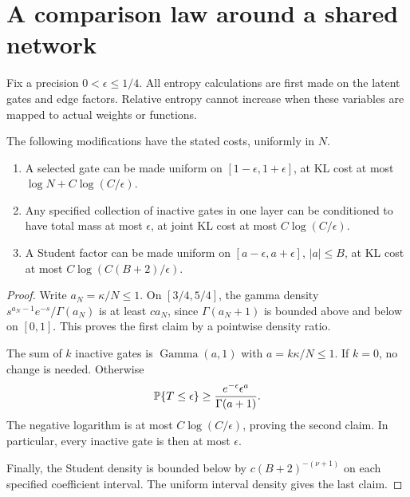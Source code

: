\section{A comparison law around a shared network}
Fix a precision $0<\epsilon\le1/4$. All entropy calculations are first made on the latent gates and edge factors. Relative entropy cannot increase when these variables are mapped to actual weights or functions.

\begin{lemma}\label{lem:scalar-gates}
The following modifications have the stated costs, uniformly in $N$.
\begin{enumerate}
\item A selected gate can be made uniform on $[1-\epsilon,1+\epsilon]$, at KL cost at most $\log N+C\log(C/\epsilon)$.
\item Any specified collection of inactive gates in one layer can be conditioned to have total mass at most $\epsilon$, at joint KL cost at most $C\log(C/\epsilon)$.
\item A Student factor can be made uniform on $[a-\epsilon,a+\epsilon]$, $|a|\le B$, at KL cost at most $C\log(C(B+2)/\epsilon)$.
\end{enumerate}
\end{lemma}
\begin{proof}
Write $a_N=\kappa/N\le1$. On $[3/4,5/4]$, the gamma density
$s^{a_N-1}e^{-s}/\Gamma(a_N)$ is at least $c a_N$, since $\Gamma(a_N+1)$ is bounded above and below on $[0,1]$. This proves the first claim by a pointwise density ratio.

The sum of $k$ inactive gates is $\operatorname{Gamma}(a,1)$ with $a=k\kappa/N\le1$. If $k=0$, no change is needed. Otherwise
\[
 \mathbb P\{T\le\epsilon\}
 \ge\frac{e^{-\epsilon}\epsilon^a}{\Gamma(a+1)}.
\]
The negative logarithm is at most $C\log(C/\epsilon)$, proving the second claim. In particular, every inactive gate is then at most $\epsilon$.

Finally, the Student density is bounded below by $c(B+2)^{-(\nu+1)}$ on each specified coefficient interval. The uniform interval density gives the last claim.
\end{proof}

